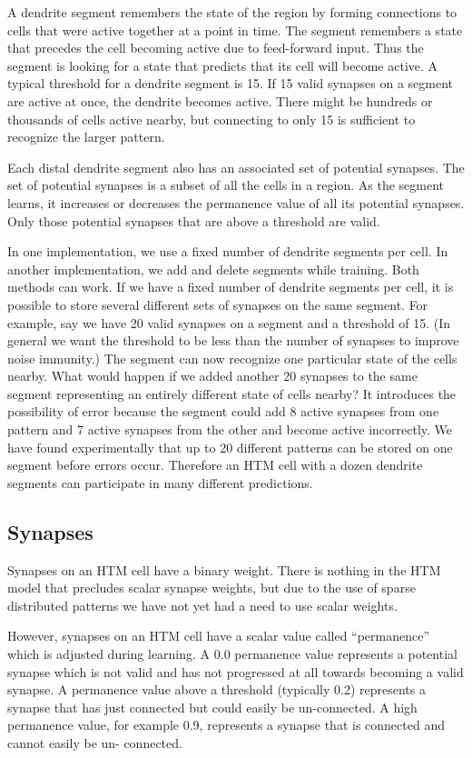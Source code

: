 \documentclass{report}
\begin{document}
A dendrite segment remembers the state of the region by forming
connections to cells that were active together at a point in time. The
segment remembers a state that precedes the cell becoming active due
to feed-forward input. Thus the segment is looking for a state that
predicts that its cell will become active. A typical threshold for a
dendrite segment is 15. If 15 valid synapses on a segment are active
at once, the dendrite becomes active. There might be hundreds or
thousands of cells active nearby, but connecting to only 15 is
sufficient to recognize the larger pattern.

Each distal dendrite segment also has an associated set of potential
synapses. The set of potential synapses is a subset of all the cells
in a region. As the segment learns, it increases or decreases the
permanence value of all its potential synapses. Only those potential
synapses that are above a threshold are valid.

In one implementation, we use a fixed number of dendrite segments per
cell. In another implementation, we add and delete segments while
training. Both methods can work. If we have a fixed number of dendrite
segments per cell, it is possible to store several different sets of
synapses on the same segment. For example, say we have 20 valid
synapses on a segment and a threshold of 15. (In general we want the
threshold to be less than the number of synapses to improve noise
immunity.) The segment can now recognize one particular state of the
cells nearby. What would happen if we added another 20 synapses to the
same segment representing an entirely different state of cells nearby?
It introduces the possibility of error because the segment could add 8
active synapses from one pattern and 7 active synapses from the other
and become active incorrectly. We have found experimentally that up to
20 different patterns can be stored on one segment before errors
occur. Therefore an HTM cell with a dozen dendrite segments can
participate in many different predictions.

\subsection*{Synapses}

Synapses on an HTM cell have a binary weight. There is nothing in the
HTM model that precludes scalar synapse weights, but due to the use of
sparse distributed patterns we have not yet had a need to use scalar
weights.

However, synapses on an HTM cell have a scalar value called
``permanence'' which is adjusted during learning. A 0.0 permanence value
represents a potential synapse which is not valid and has not
progressed at all towards becoming a valid synapse. A permanence value
above a threshold (typically 0.2) represents a synapse that has just
connected but could easily be un-connected. A high permanence value,
for example 0.9, represents a synapse that is connected and cannot
easily be un- connected.
\end{document}
